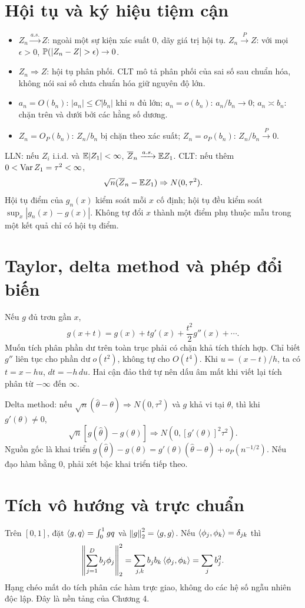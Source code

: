 \section*{Hội tụ và ký hiệu tiệm cận}
\begin{itemize}
\item $Z_n\xrightarrow{a.s.}Z$: ngoài một sự kiện xác suất 0, dãy giá trị
  hội tụ. $Z_n\xrightarrow{P}Z$: với mọi $\epsilon>0$,
  $\Pp(|Z_n-Z|>\epsilon)\to0$.
\item $Z_n\Rightarrow Z$: hội tụ phân phối. CLT mô tả phân phối của
  sai số sau chuẩn hóa, không nói sai số chưa chuẩn hóa giữ nguyên độ lớn.
\item $a_n=O(b_n)$: $|a_n|\leq C|b_n|$ khi $n$ đủ lớn;
  $a_n=o(b_n)$: $a_n/b_n\to0$; $a_n\asymp b_n$: chặn trên và dưới
  bởi các hằng số dương.
\item $Z_n=O_P(b_n)$: $Z_n/b_n$ bị chặn theo xác suất;
  $Z_n=o_P(b_n)$: $Z_n/b_n\xrightarrow P0$.
\end{itemize}
LLN: nếu $Z_i$ i.i.d. và $\mathbb E|Z_1|<\infty$,
$\overline Z_n\xrightarrow{a.s.}\mathbb E Z_1$.
CLT: nếu thêm $0<\operatorname{Var} Z_1=\tau^2<\infty$,
\[
\sqrt n(\overline Z_n-\mathbb E Z_1)\Rightarrow N(0,\tau^2).
\]
Hội tụ điểm của $g_n(x)$ kiểm soát mỗi $x$ cố định; hội tụ đều kiểm soát
$\sup_x|g_n(x)-g(x)|$. Không tự đổi $x$ thành một điểm phụ thuộc mẫu
trong một kết quả chỉ có hội tụ điểm.

\section*{Taylor, delta method và phép đổi biến}
Nếu $g$ đủ trơn gần $x$,
\[
g(x+t)=g(x)+tg'(x)+\frac{t^2}2g''(x)+\cdots.
\]
Muốn tích phân phần dư trên toàn trục phải có chặn khả tích thích hợp.
Chỉ biết $g''$ liên tục cho phần dư $o(t^2)$, không tự cho $O(t^4)$.
Khi $u=(x-t)/h$, ta có $t=x-hu$, $dt=-h\,du$. Hai cận đảo thứ tự
nên dấu âm mất khi viết lại tích phân từ $-\infty$ đến $\infty$.

Delta method: nếu $\sqrt n(\widehat\theta-\theta)\Rightarrow N(0,\tau^2)$
và $g$ khả vi tại $\theta$, thì khi $g'(\theta)\ne0$,
\[
\sqrt n[g(\widehat\theta)-g(\theta)]
\Rightarrow N(0,[g'(\theta)]^2\tau^2).
\]
Nguồn gốc là khai triển $g(\widehat\theta)-g(\theta)
=g'(\theta)(\widehat\theta-\theta)+o_P(n^{-1/2})$.
Nếu đạo hàm bằng 0, phải xét bậc khai triển tiếp theo.

\section*{Tích vô hướng và trực chuẩn}
Trên $[0,1]$, đặt $\left\langle g,q\right\rangle=\int_0^1gq$ và
$\left\lVert g\right\rVert_2^2=\left\langle g,g\right\rangle$. Nếu $\left\langle \phi_j,\phi_k\right\rangle=\delta_{jk}$ thì
\[
\left\lVert \sum_{j=1}^Db_j\phi_j\right\rVert_2^2
=\sum_{j,k}b_jb_k\left\langle \phi_j,\phi_k\right\rangle=\sum_jb_j^2.
\]
Hạng chéo mất do tích phân các hàm trực giao, không do các hệ số ngẫu nhiên
độc lập. Đây là nền tảng của Chương 4.

